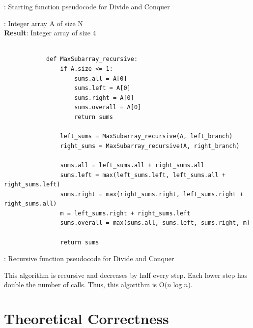 \documentclass[a4paper,10pt]{article}
\begin{document}
			\begin{center}
			: Starting function pseudocode for Divide and Conquer
			\end{center}

			\vspace{1em}
			
			: Integer array A of size N \\
			{\bf Result}: Integer array of size 4

			\begin{minipage}[!h]{6in}
			\begin{verbatim}

			def MaxSubarray_recursive:
			    if A.size <= 1:
			        sums.all = A[0]
			        sums.left = A[0]
			        sums.right = A[0]
			        sums.overall = A[0]
			        return sums

			    left_sums = MaxSubarray_recursive(A, left_branch)
			    right_sums = MaxSubarray_recursive(A, right_branch)

			    sums.all = left_sums.all + right_sums.all
			    sums.left = max(left_sums.left, left_sums.all + right_sums.left)
			    sums.right = max(right_sums.right, left_sums.right + right_sums.all)
			    m = left_sums.right + right_sums.left
			    sums.overall = max(sums.all, sums.left, sums.right, m)

			    return sums
			\end{verbatim}
			\end{minipage}

			\begin{center}
			: Recursive function pseudocode for Divide and Conquer
			\end{center}

			\vspace{1em}

			\noindent This algorithm is recursive and decreases by half every step. Each lower step has double the number of calls. Thus, this algorithm is O($n \log n$).


	\section{Theoretical Correctness}
\end{document}
